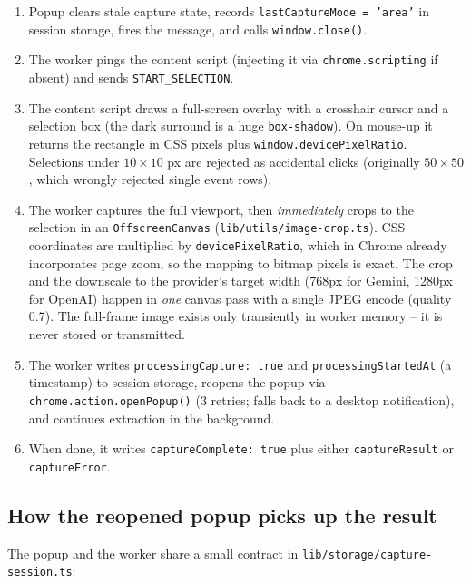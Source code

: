 \documentclass[11pt]{article}
\begin{document}
\begin{enumerate}
  \item Popup clears stale capture state, records
        \texttt{lastCaptureMode = 'area'} in session storage, fires the
        message, and calls \texttt{window.close()}.
  \item The worker pings the content script (injecting it via
        \texttt{chrome.scripting} if absent) and sends
        \texttt{START\_SELECTION}.
  \item The content script draws a full-screen overlay with a crosshair
        cursor and a selection box (the dark surround is a huge
        \texttt{box-shadow}). On mouse-up it returns the rectangle in CSS
        pixels plus \texttt{window.devicePixelRatio}. Selections under
        $10\times10$ px are rejected as accidental clicks (originally
        $50\times50$, which wrongly rejected single event rows).
  \item The worker captures the full viewport, then \emph{immediately} crops
        to the selection in an \texttt{OffscreenCanvas}
        (\texttt{lib/utils/image-crop.ts}). CSS coordinates are multiplied by
        \texttt{devicePixelRatio}, which in Chrome already incorporates page
        zoom, so the mapping to bitmap pixels is exact. The crop and the
        downscale to the provider's target width (768px for Gemini, 1280px
        for OpenAI) happen in \emph{one} canvas pass with a single JPEG
        encode (quality 0.7). The full-frame image exists only transiently in
        worker memory -- it is never stored or transmitted.
  \item The worker writes \texttt{processingCapture: true} and
        \texttt{processingStartedAt} (a timestamp) to session storage,
        reopens the popup via \texttt{chrome.action.openPopup()} (3 retries;
        falls back to a desktop notification), and continues extraction in
        the background.
  \item When done, it writes \texttt{captureComplete: true} plus either
        \texttt{captureResult} or \texttt{captureError}.
\end{enumerate}

\subsection{How the reopened popup picks up the result}

The popup and the worker share a small contract in
\texttt{lib/storage/capture-session.ts}:
\end{document}

